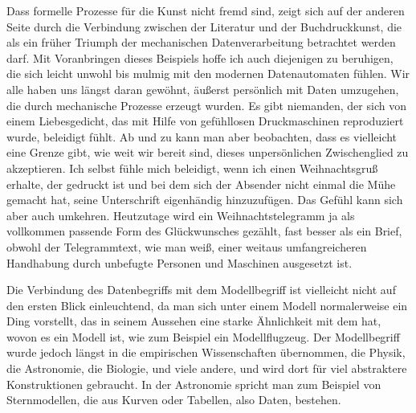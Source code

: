 {Dass formelle Prozesse für die Kunst nicht fremd sind, zeigt sich auf der anderen Seite durch die Verbindung zwischen der Literatur und der Buchdruckkunst, die als ein früher Triumph der mechanischen Datenverarbeitung betrachtet werden darf. Mit Voranbringen dieses Beispiels hoffe ich auch diejenigen zu beruhigen, die sich leicht unwohl bis mulmig mit den modernen Datenautomaten fühlen. Wir alle haben uns längst daran gewöhnt, äußerst persönlich mit Daten umzugehen, die durch mechanische Prozesse erzeugt wurden. Es gibt niemanden, der sich von einem Liebesgedicht, das mit Hilfe von gefühllosen Druckmaschinen reproduziert wurde, beleidigt fühlt. Ab und zu kann man aber beobachten, dass es vielleicht eine Grenze gibt, wie weit wir bereit sind, dieses unpersönlichen Zwischenglied zu akzeptieren. Ich selbst fühle mich beleidigt, wenn ich einen Weihnachtsgruß erhalte, der gedruckt ist und bei dem sich der Absender nicht einmal die Mühe gemacht hat, seine Unterschrift eigenhändig hinzuzufügen. Das Gefühl kann sich aber auch umkehren. Heutzutage wird ein Weihnachtstelegramm ja als vollkommen passende Form des Glückwunsches gezählt, fast besser als ein Brief, obwohl der Telegrammtext, wie man weiß, einer weitaus umfangreicheren Handhabung durch unbefugte Personen und Maschinen ausgesetzt ist. 

Die Verbindung des Datenbegriffs mit dem Modellbegriff ist vielleicht nicht auf den ersten Blick einleuchtend, da man sich unter einem Modell normalerweise ein Ding vorstellt, das in seinem Aussehen eine starke Ähnlichkeit mit dem hat, wovon es ein Modell ist, wie zum Beispiel ein Modellflugzeug. Der Modellbegriff wurde jedoch längst in die empirischen Wissenschaften übernommen, die Physik, die Astronomie, die Biologie, und viele andere, und wird dort für viel abstraktere Konstruktionen gebraucht. In der Astronomie spricht man zum Beispiel von Sternmodellen, die aus Kurven oder Tabellen, also Daten, bestehen. 
}


